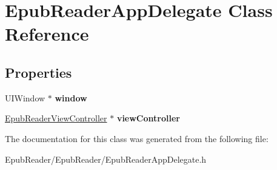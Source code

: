 \hypertarget{interface_epub_reader_app_delegate}{\section{Epub\-Reader\-App\-Delegate Class Reference}
\label{interface_epub_reader_app_delegate}
}
\subsection*{Properties}
\begin{DoxyCompactItemize}
\item 
\hypertarget{interface_epub_reader_app_delegate_a2d2b3a195d0b5d0a39752da219a1d7f8}{U\-I\-Window $\ast$ {\bfseries window}}\label{interface_epub_reader_app_delegate_a2d2b3a195d0b5d0a39752da219a1d7f8}

\item 
\hypertarget{interface_epub_reader_app_delegate_af3e364fa0f3833b9fad8eed5bb3af178}{\hyperlink{interface_epub_reader_view_controller}{Epub\-Reader\-View\-Controller} $\ast$ {\bfseries view\-Controller}}\label{interface_epub_reader_app_delegate_af3e364fa0f3833b9fad8eed5bb3af178}

\end{DoxyCompactItemize}


The documentation for this class was generated from the following file\-:\begin{DoxyCompactItemize}
\item 
Epub\-Reader/\-Epub\-Reader/Epub\-Reader\-App\-Delegate.\-h\end{DoxyCompactItemize}

